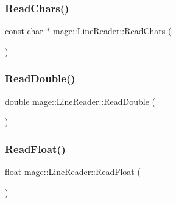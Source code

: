 \hypertarget{classmage_1_1_line_reader_ad915c1a17549c7758c10f0b6db7e5611}{}\label{classmage_1_1_line_reader_ad915c1a17549c7758c10f0b6db7e5611} 
\subsubsection{\texorpdfstring{Read\+Chars()}{ReadChars()}}
{\footnotesize\ttfamily const char $\ast$ mage\+::\+Line\+Reader\+::\+Read\+Chars (\begin{DoxyParamCaption}{ }\end{DoxyParamCaption})\hspace{0.3cm}{\ttfamily [protected]}}

\hypertarget{classmage_1_1_line_reader_a17f11afdea4692395115c6bdfde03660}{}\label{classmage_1_1_line_reader_a17f11afdea4692395115c6bdfde03660} 
\subsubsection{\texorpdfstring{Read\+Double()}{ReadDouble()}}
{\footnotesize\ttfamily double mage\+::\+Line\+Reader\+::\+Read\+Double (\begin{DoxyParamCaption}{ }\end{DoxyParamCaption})\hspace{0.3cm}{\ttfamily [protected]}}

\hypertarget{classmage_1_1_line_reader_ae691928873b110dd273e72a47f2008cb}{}\label{classmage_1_1_line_reader_ae691928873b110dd273e72a47f2008cb} 
\subsubsection{\texorpdfstring{Read\+Float()}{ReadFloat()}}
{\footnotesize\ttfamily float mage\+::\+Line\+Reader\+::\+Read\+Float (\begin{DoxyParamCaption}{ }\end{DoxyParamCaption})\hspace{0.3cm}{\ttfamily [protected]}}

\hypertarget{classmage_1_1_line_reader_a7a73a4e642db14da3f68ae65873ae333}{}\label{classmage_1_1_line_reader_a7a73a4e642db14da3f68ae65873ae333} 
